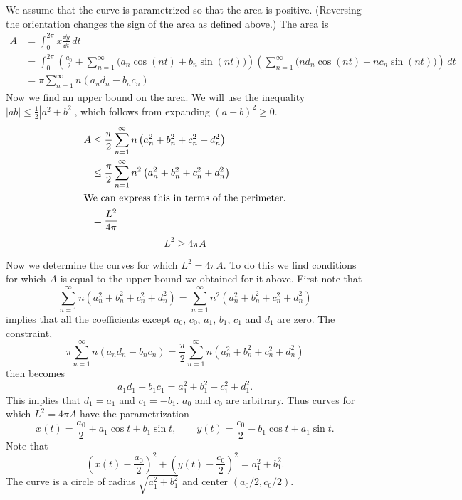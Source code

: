 {\begin{Solution}
  We assume that the curve is parametrized so that the area is positive.
  (Reversing the orientation changes the sign of the area as defined above.)
  The area is 
  \begin{align*}
    A       &= \int_0^{2\pi} x \frac{\dd y}{\dd t} \,d t \\
    &= \int_0^{2 \pi} \left( 
      \frac{a_0}{2} + \sum_{n = 1}^\infty \big( a_n \cos(n t) 
      + b_n \sin(n t) \big) \right)
    \left( \sum_{n = 1}^\infty \big( n d_n \cos(n t) 
      - n c_n \sin(n t) \big)  \right) \,d t \\
    &= \pi \sum_{n = 1}^\infty n ( a_n d_n - b_n c_n ) 
  \end{align*}
  Now we find an upper bound on the area.  We will use the inequality
  $|a b| \leq \frac{1}{2} | a^2 + b^2 |$, which follows from expanding
  $(a-b)^2 \geq 0$.
  \begin{align*}
    A       &\leq \frac{\pi}{2} \sum_{n = 1}^\infty n 
    \left( a_n^2 + b_n^2 + c_n^2 + d_n^2 \right) \\
    &\leq \frac{\pi}{2} \sum_{n = 1}^\infty n^2 
    \left( a_n^2 + b_n^2 + c_n^2 + d_n^2 \right) \\
    \intertext{We can express this in terms of the perimeter.}
    &= \frac{L^2}{4 \pi}
  \end{align*}
  \[
  \boxed{
    L^2 \geq 4 \pi A
    }
  \]



  Now we determine the curves for which $L^2 = 4 \pi A$.  To do this we find 
  conditions for which $A$ is equal to the upper bound we obtained for it 
  above.  
  First note that
  \[
  \sum_{n = 1}^\infty n \left( a_n^2 + b_n^2 + c_n^2 + d_n^2 \right) 
  = \sum_{n = 1}^\infty n^2 \left( a_n^2 + b_n^2 + c_n^2 + d_n^2 \right) 
  \]
  implies that all the coefficients except $a_0$, $c_0$, $a_1$, $b_1$, 
  $c_1$ and $d_1$ are zero.
  The constraint,
  \[
  \pi \sum_{n = 1}^\infty n ( a_n d_n - b_n c_n ) 
  = \frac{\pi}{2} \sum_{n = 1}^\infty n \left( a_n^2 + b_n^2 + c_n^2 + d_n^2 \right)
  \]
  then becomes
  \[
  a_1 d_1 - b_1 c_1 = a_1^2 + b_1^2 + c_1^2 + d_1^2.
  \]
  This implies that $d_1 = a_1$ and $c_1 = - b_1$.  $a_0$ and $c_0$ are 
  arbitrary.  Thus curves for which $L^2 = 4 \pi A$ have the parametrization
  \[
  x(t) = \frac{a_0}{2} + a_1 \cos t + b_1 \sin t, \qquad
  y(t) = \frac{c_0}{2} - b_1 \cos t + a_1 \sin t.
  \]
  Note that 
  \[
  \left( x(t) - \frac{a_0}{2} \right)^2 + \left( y(t) - \frac{c_0}{2} \right)^2
  = a_1^2 + b_1^2.
  \]
  The curve is a circle of radius $\sqrt{a_1^2 + b_1^2}$ and center
  $( a_0 / 2, c_0 / 2 )$.
\end{Solution}







}
